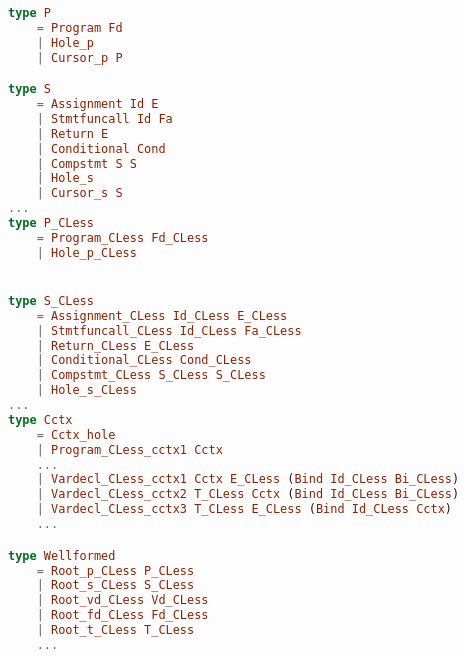 \begin{minipage}{\textwidth}
    \begin{lstlisting}[style=inline, language=elm, caption={Generated ADT for the C language}, label={lst:c-adts}]
type P
    = Program Fd
    | Hole_p
    | Cursor_p P

type S
    = Assignment Id E
    | Stmtfuncall Id Fa
    | Return E
    | Conditional Cond
    | Compstmt S S
    | Hole_s
    | Cursor_s S
...
type P_CLess
    = Program_CLess Fd_CLess
    | Hole_p_CLess


type S_CLess
    = Assignment_CLess Id_CLess E_CLess
    | Stmtfuncall_CLess Id_CLess Fa_CLess
    | Return_CLess E_CLess
    | Conditional_CLess Cond_CLess
    | Compstmt_CLess S_CLess S_CLess
    | Hole_s_CLess
...
type Cctx
    = Cctx_hole
    | Program_CLess_cctx1 Cctx
    ...
    | Vardecl_CLess_cctx1 Cctx E_CLess (Bind Id_CLess Bi_CLess)
    | Vardecl_CLess_cctx2 T_CLess Cctx (Bind Id_CLess Bi_CLess)
    | Vardecl_CLess_cctx3 T_CLess E_CLess (Bind Id_CLess Cctx)
    ...

type Wellformed
    = Root_p_CLess P_CLess
    | Root_s_CLess S_CLess
    | Root_vd_CLess Vd_CLess
    | Root_fd_CLess Fd_CLess
    | Root_t_CLess T_CLess
    ...
\end{lstlisting}
\end{minipage}

